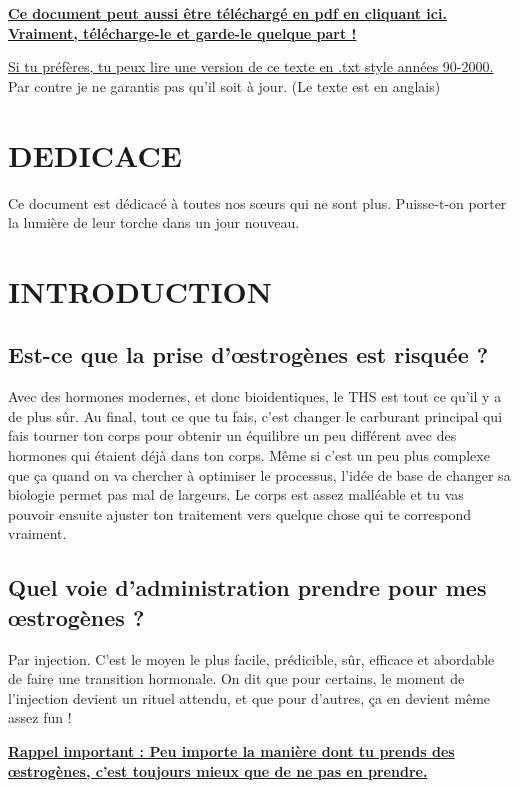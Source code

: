 \documentclass{article}
\begin{document}
\noindent\textbf{\href{PDF_LINK}{Ce document peut aussi être téléchargé en pdf en cliquant ici. Vraiment, télécharge-le et garde-le quelque part !}}

\noindent\href{https://pghrt.diy/pghrtgretchensversion.txt}{Si tu préfères, tu peux lire une version de ce texte en .txt style années 90-2000.} Par contre je ne garantis pas qu'il soit à jour. (Le texte est en anglais)



\section*{DEDICACE}

Ce document est dédicacé à toutes nos sœurs qui ne sont plus. Puisse-t-on porter la lumière de leur torche dans un jour nouveau.

\section{INTRODUCTION}

\subsection{Est-ce que la prise d'œstrogènes est risquée ?}

Avec des hormones modernes, et donc bioidentiques, le THS est tout ce qu'il y a de plus sûr. Au final, tout ce que tu fais, c'est changer le carburant principal qui fais tourner ton corps pour obtenir un équilibre un peu différent avec des hormones qui étaient déjà dans ton corps. Même si c'est un peu plus complexe que ça quand on va chercher à optimiser le processus, l'idée de base de changer sa biologie permet pas mal de largeurs. Le corps est assez malléable et tu vas pouvoir ensuite ajuster ton traitement vers quelque chose qui te correspond vraiment.

\subsection{Quel voie d'administration prendre pour mes œstrogènes ?}

Par injection. C'est le moyen le plus facile, prédicible, sûr, efficace et abordable de faire une transition hormonale. On dit que pour certains, le moment de l'injection devient un rituel attendu, et que pour d'autres, ça en devient même assez fun !  

\noindent\underline{\textbf{Rappel important : Peu importe la manière dont tu prends des œstrogènes, c'est toujours mieux que de ne pas en prendre.}}
\end{document}
